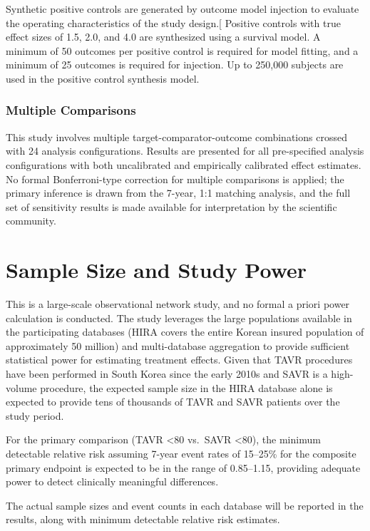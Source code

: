 \documentclass[
  12pt,
]{article}
\begin{document}
Synthetic positive controls are generated by outcome model injection to
evaluate the operating characteristics of the study
design.{[}\citeproc{ref-Schuemie2018-zi}{15}{]} Positive controls with
true effect sizes of 1.5, 2.0, and 4.0 are synthesized using a survival
model. A minimum of 50 outcomes per positive control is required for
model fitting, and a minimum of 25 outcomes is required for injection.
Up to 250,000 subjects are used in the positive control synthesis model.

\subsubsection{Multiple Comparisons}\label{multiple-comparisons}

This study involves multiple target-comparator-outcome combinations
crossed with 24 analysis configurations. Results are presented for all
pre-specified analysis configurations with both uncalibrated and
empirically calibrated effect estimates. No formal Bonferroni-type
correction for multiple comparisons is applied; the primary inference is
drawn from the 7-year, 1:1 matching analysis, and the full set of
sensitivity results is made available for interpretation by the
scientific community.

\section{Sample Size and Study Power}\label{sample-size}

This is a large-scale observational network study, and no formal a
priori power calculation is conducted. The study leverages the large
populations available in the participating databases (HIRA covers the
entire Korean insured population of approximately 50 million) and
multi-database aggregation to provide sufficient statistical power for
estimating treatment effects. Given that TAVR procedures have been
performed in South Korea since the early 2010s and SAVR is a high-volume
procedure, the expected sample size in the HIRA database alone is
expected to provide tens of thousands of TAVR and SAVR patients over the
study period.

For the primary comparison (TAVR \textless80 vs.~SAVR \textless80), the
minimum detectable relative risk assuming 7-year event rates of 15--25\%
for the composite primary endpoint is expected to be in the range of
0.85--1.15, providing adequate power to detect clinically meaningful
differences.

The actual sample sizes and event counts in each database will be
reported in the results, along with minimum detectable relative risk
estimates.
\end{document}

